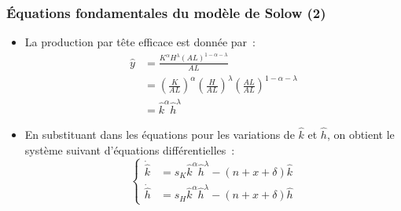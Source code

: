 \documentclass[10pt,notheorems]{beamer}
\theoremstyle{plain}
\theoremstyle{definition} %
\begin{document}
\begin{frame}
  \frametitle{Équations fondamentales du modèle de Solow (2)}

  \begin{itemize}

  \item La production par tête efficace est donnée par~:
    \medskip
    \[
      \begin{split}
        \hat y &= \frac{K^{\alpha}H^{\lambda}\left(AL\right)^{1-\alpha-\lambda}}{AL}\\
               &= \left(\frac{K}{AL}\right)^{\alpha}\left(\frac{H}{AL}\right)^{\lambda}\left(\frac{AL}{AL}\right)^{1-\alpha-\lambda}\\
               &= \hat k^\alpha \hat h^\lambda
      \end{split}
    \]
    \medskip

  \item En substituant dans les équations pour les variations de $\hat k$ et $\hat h$, on obtient le système suivant d'équations différentielles~:
    \[
      \begin{cases}
        \dot{\hat k} &= s_K\hat k^\alpha \hat h^\lambda - (n+x+\delta) \hat k \\
        \dot{\hat h} &= s_H\hat k^\alpha \hat h^\lambda - (n+x+\delta) \hat h
      \end{cases}
    \]
  \end{itemize}

\end{frame}
\end{document}
